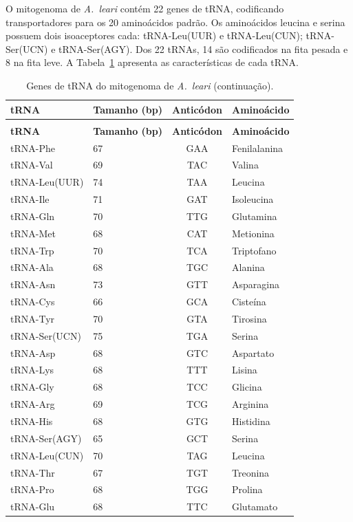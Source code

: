 O mitogenoma de \textit{A.~leari} contém 22 genes de tRNA, codificando transportadores para os 20 aminoácidos padrão. Os aminoácidos leucina e serina possuem dois isoaceptores cada: tRNA-Leu(UUR) e tRNA-Leu(CUN); tRNA-Ser(UCN) e tRNA-Ser(AGY). Dos 22 tRNAs, 14 são codificados na fita pesada e 8 na fita leve. A Tabela~\ref{tab:trna} apresenta as características de cada tRNA.

\begin{longtable}{@{}llcl@{}}
\caption{Genes de tRNA do mitogenoma de \textit{A.~leari}.}
\label{tab:trna} \\
\toprule
\textbf{tRNA} & \textbf{Tamanho (bp)} & \textbf{Anticódon} & \textbf{Aminoácido} \\
\midrule
\endfirsthead
\caption[]{Genes de tRNA do mitogenoma de \textit{A.~leari} (continuação).} \\
\toprule
\textbf{tRNA} & \textbf{Tamanho (bp)} & \textbf{Anticódon} & \textbf{Aminoácido} \\
\midrule
\endhead
\bottomrule
\endfoot
tRNA-Phe     & 67 & GAA & Fenilalanina \\
tRNA-Val     & 69 & TAC & Valina \\
tRNA-Leu(UUR) & 74 & TAA & Leucina \\
tRNA-Ile     & 71 & GAT & Isoleucina \\
tRNA-Gln     & 70 & TTG & Glutamina \\
tRNA-Met     & 68 & CAT & Metionina \\
tRNA-Trp     & 70 & TCA & Triptofano \\
tRNA-Ala     & 68 & TGC & Alanina \\
tRNA-Asn     & 73 & GTT & Asparagina \\
tRNA-Cys     & 66 & GCA & Cisteína \\
tRNA-Tyr     & 70 & GTA & Tirosina \\
tRNA-Ser(UCN) & 75 & TGA & Serina \\
tRNA-Asp     & 68 & GTC & Aspartato \\
tRNA-Lys     & 68 & TTT & Lisina \\
tRNA-Gly     & 68 & TCC & Glicina \\
tRNA-Arg     & 69 & TCG & Arginina \\
tRNA-His     & 68 & GTG & Histidina \\
tRNA-Ser(AGY) & 65 & GCT & Serina \\
tRNA-Leu(CUN) & 70 & TAG & Leucina \\
tRNA-Thr     & 67 & TGT & Treonina \\
tRNA-Pro     & 68 & TGG & Prolina \\
tRNA-Glu     & 68 & TTC & Glutamato \\
\end{longtable}

